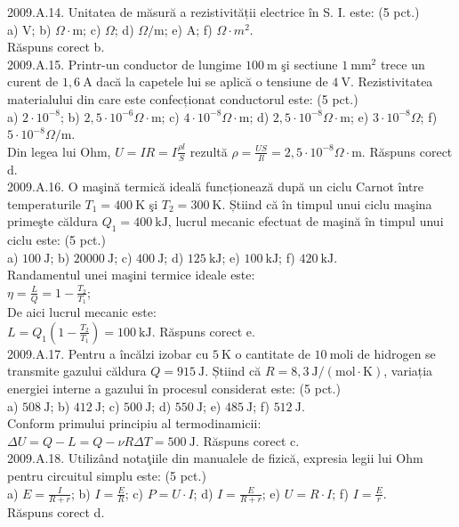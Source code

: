 2009.A.14. Unitatea de măsură a rezistivității electrice în S. I. este: (5 pct.)\\ a) $\mathrm{V}$; b) $\Omega \cdot \mathrm{m}$; c) $\Omega$; d) $\Omega / \mathrm{m}$; e) $\mathrm{A}$; f) $\Omega \cdot m^{2}$.\\ Răspuns corect b.\\

2009.A.15. Printr-un conductor de lungime $100 \mathrm{~m}$ şi sectiune $1 \mathrm{~mm}^{2}$ trece un curent de $1,6 \mathrm{~A}$ dacă la capetele lui se aplică o tensiune de $4 \mathrm{~V}$. Rezistivitatea materialului din care este confecționat conductorul este: (5 pct.)\\ a) $2 \cdot 10^{-8}$; b) $2,5 \cdot 10^{-6} \Omega \cdot \mathrm{m}$; c) $4 \cdot 10^{-8} \Omega \cdot \mathrm{m}$; d) $2,5 \cdot 10^{-8} \Omega \cdot \mathrm{m}$; e) $3 \cdot 10^{-8} \Omega$; f) $5 \cdot 10^{-8} \Omega / \mathrm{m}$.\\ Din legea lui Ohm, $U=I R=I \frac{\rho l}{S}$ rezultă $\rho=\frac{U S}{I l}=2,5 \cdot 10^{-8} \Omega \cdot \mathrm{m}$. Răspuns corect d.\\

2009.A.16. O maşină termică ideală funcționează după un ciclu Carnot între temperaturile $T_{1}=400 \mathrm{~K}$ şi $T_{2}=300 \mathrm{~K}$. Știind că în timpul unui ciclu maşina primeşte căldura $Q_{1}=400 \mathrm{~kJ}$, lucrul mecanic efectuat de maşină în timpul unui ciclu este: (5 pct.)\\ a) $100 \mathrm{~J}$; b) $20000 \mathrm{~J}$; c) $400 \mathrm{~J}$; d) $125 \mathrm{~kJ}$; e) $100 \mathrm{~kJ}$; f) $420 \mathrm{~kJ}$.\\ Randamentul unei maşini termice ideale este:\\ $\eta=\frac{L}{Q}=1-\frac{T_{2}}{T_{1}}$;\\ De aici lucrul mecanic este:\\ $L=Q_{1}(1-\frac{T_{2}}{T_{1}})=100 \mathrm{~kJ}$. Răspuns corect e.\\

2009.A.17. Pentru a încălzi izobar cu $5 \mathrm{~K}$ o cantitate de $10 \mathrm{~moli}$ de hidrogen se transmite gazului căldura $Q=915 \mathrm{~J}$. Știind că $R=8,3 \mathrm{~J} /(\mathrm{mol} \cdot \mathrm{K})$, variația energiei interne a gazului în procesul considerat este: (5 pct.)\\ a) $508 \mathrm{~J}$; b) $412 \mathrm{~J}$; c) $500 \mathrm{~J}$; d) $550 \mathrm{~J}$; e) $485 \mathrm{~J}$; f) $512 \mathrm{~J}$.\\ Conform primului principiu al termodinamicii:\\ $\Delta U=Q-L=Q-\nu R \Delta T=500 \mathrm{~J}$. Răspuns corect c.\\

2009.A.18. Utilizând notaţiile din manualele de fizică, expresia legii lui Ohm pentru circuitul simplu este: (5 pct.)\\ a) $E=\frac{I}{R+r}$; b) $I=\frac{E}{R}$; c) $P=U \cdot I$; d) $I=\frac{E}{R+r}$; e) $U=R \cdot I$; f) $I=\frac{E}{r}$.\\ Răspuns corect d.\\